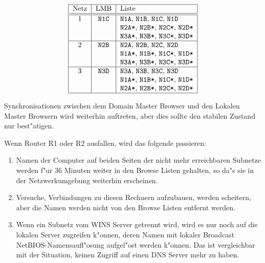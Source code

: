 \documentclass{scrartcl}
\newcommand{\nbname}{\texttt}
\begin{document}
\vspace{\baselineskip}
\[\begin{tabular}{|c|c|l|}
\hline
Netz & LMB &  Liste \\ \hline \hline
1 & \nbname{N1C} & \nbname{N1A}, \nbname{N1B}, \nbname{N1C}, \nbname{N1D}\\
  & & \nbname{N2A*}, \nbname{N2B*}, \nbname{N2C*}, \nbname{N2D*}\\
  & & \nbname{N3A*}, \nbname{N3B*}, \nbname{N3C*}, \nbname{N3D*}\\
\hline
2 & \nbname{N2B} & \nbname{N2A}, \nbname{N2B}, \nbname{N2C}, \nbname{N2D}\\
  & & \nbname{N1A*}, \nbname{N1B*}, \nbname{N1C*}, \nbname{N1D*}\\
  & & \nbname{N3A*}, \nbname{N3B*}, \nbname{N3C*}, \nbname{N3D*}\\
\hline
3 & \nbname{N3D} & \nbname{N3A}, \nbname{N3B}, \nbname{N3C}, \nbname{N3D}\\
  & & \nbname{N1A*}, \nbname{N1B*}, \nbname{N1C*}, \nbname{N1D*}\\
  & & \nbname{N2A*}, \nbname{N2B*}, \nbname{N2C*}, \nbname{N2D*}\\
\hline
\end{tabular}\]
\vspace{\baselineskip}

Synchronisationen zwischen dem Domain Master Browser und den Lokalen
Master Browsern wird weiterhin auftreten, aber dies sollte den
stabilen Zustand nur best"atigen.

Wenn Router R1 oder R2 ausfallen, wird das folgende passieren:

\begin{enumerate}
\item Namen der Computer auf beiden Seiten der nicht mehr erreichbaren
Subnetze werden f"ur 36 Minuten weiter in den Browse Listen gehalten,
so da"s sie in der Netzwerkumgebung weiterhin erscheinen.

\item Versuche, Verbindungen zu diesen Rechnern aufzubauen, werden
scheitern, aber die Namen werden nicht von den Browse Listen entfernt
werden.

\item Wenn ein Subnetz vom WINS Server getrennt wird, wird es nur noch
auf die lokalen Server zugreifen k"onnen, deren Namen mit lokaler
Broadcast NetBIOS-Namensaufl"osung aufgel"ost werden k"onnen. Das ist
vergleichbar mit der Situation, keinen Zugriff auf einen DNS Server
mehr zu haben.
\end{enumerate}
\end{document}
